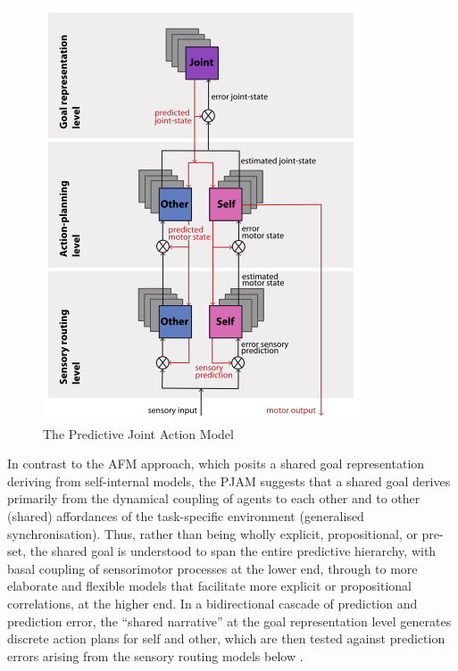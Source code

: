   \begin{figure}[htbp]
    \begin{center}
      \includegraphics[scale=.8]{images/PJAM.png}
        \caption{The Predictive Joint Action Model \citep{Pesquita2017}}
          \label{fig:PJAM}
     \end{center}
  \end{figure}

In contrast to the AFM approach, which posits a shared goal representation deriving from self-internal models, the PJAM suggests that a shared goal derives primarily from the dynamical coupling of agents to each other and to other (shared) affordances of the task-specific environment (generalised synchronisation).  Thus, rather than being wholly explicit, propositional, or pre-set, the shared goal is understood to span the entire predictive hierarchy, with basal coupling of sensorimotor processes at the lower end, through to more elaborate and flexible models that facilitate more explicit or propositional correlations, at the higher end.  In a bidirectional cascade of prediction and prediction error, the ``shared narrative'' at the goal representation level generates discrete action plans for self and other, which are then tested against prediction errors arising from the sensory routing models below \citep{Pesquita2017}.

